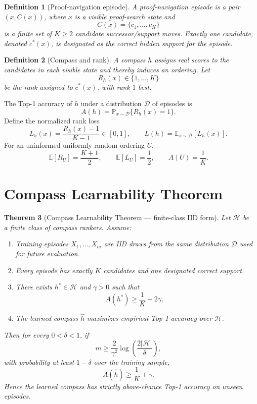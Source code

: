\documentclass[11pt]{article}
\newtheorem{theorem}{Theorem}[section]
\newtheorem{definition}[theorem]{Definition}
\newcommand{\Prob}{\mathbb{P}}
\newcommand{\E}{\mathbb{E}}
\newcommand{\Hcal}{\mathcal{H}}
\newcommand{\Dcal}{\mathcal{D}}
\begin{document}
\begin{definition}[Proof-navigation episode]
A proof-navigation episode is a pair $(x,C(x))$, where $x$ is a visible proof-search state and
\[
C(x)=\{c_1,\ldots,c_K\}
\]
is a finite set of $K\ge 2$ candidate successor/support moves. Exactly one candidate, denoted $c^*(x)$, is designated as the correct hidden support for the episode.
\end{definition}

\begin{definition}[Compass and rank]
A \emph{compass} $h$ assigns real scores to the candidates in each visible state and thereby induces an ordering. Let
\[
R_h(x)\in\{1,\ldots,K\}
\]
be the rank assigned to $c^*(x)$, with rank $1$ best.
\end{definition}

The Top-1 accuracy of $h$ under a distribution $\Dcal$ of episodes is
\[
A(h)=\Prob_{x\sim\Dcal}\{R_h(x)=1\}.
\]
Define the normalized rank loss
\[
L_h(x)=\frac{R_h(x)-1}{K-1}\in[0,1],
\qquad
L(h)=\E_{x\sim\Dcal}[L_h(x)].
\]
For an uninformed uniformly random ordering $U$,
\[
\E[R_U]=\frac{K+1}{2},
\qquad
\E[L_U]=\frac12,
\qquad
A(U)=\frac1K.
\]

\section{Compass Learnability Theorem}

\begin{theorem}[Compass Learnability Theorem --- finite-class IID form]
\label{thm:learn}
Let $\Hcal$ be a finite class of compass rankers. Assume:
\begin{enumerate}[label=(H\arabic*),leftmargin=2.7em]
\item Training episodes $X_1,\ldots,X_m$ are IID draws from the same distribution $\Dcal$ used for future evaluation.
\item Every episode has exactly $K$ candidates and one designated correct support.
\item There exists $h^*\in\Hcal$ and $\gamma>0$ such that
\[
A(h^*)\ge \frac1K+2\gamma.
\]
\item The learned compass $\widehat h$ maximizes empirical Top-1 accuracy over $\Hcal$.
\end{enumerate}
Then for every $0<\delta<1$, if
\[
m\ge \frac{2}{\gamma^2}\log\!\left(\frac{2|\Hcal|}{\delta}\right),
\]
with probability at least $1-\delta$ over the training sample,
\[
A(\widehat h)\ge \frac1K+\gamma.
\]
Hence the learned compass has strictly above-chance Top-1 accuracy on unseen episodes.
\end{theorem}
\end{document}
